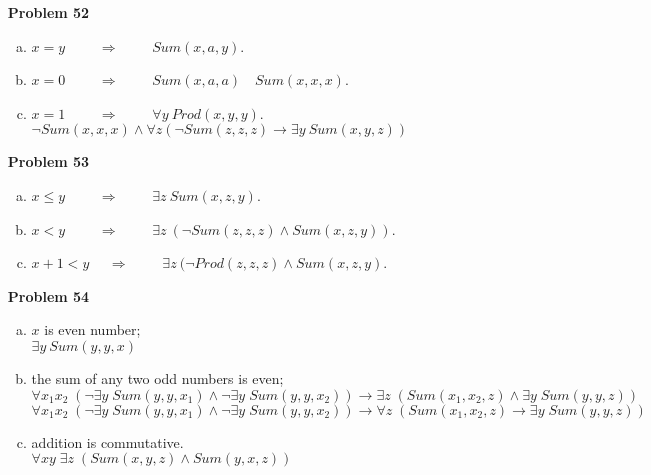 \begin{enumerate}
\item[\textbf{Problem 52}] 
\begin{enumerate}[(a)]
\item $x = y$   $\qquad \Rightarrow \qquad $ $Sum(x, a, y)$. 
\item $x = 0$   $\qquad \Rightarrow \qquad $ $Sum(x, a, a) \quad Sum(x, x, x)$. 
\item $x = 1$   $\qquad \Rightarrow \qquad $ $\forall y \:Prod(x, y, y)$. \\
                       $\neg Sum(x, x, x) \wedge \forall z(\neg Sum(z, z, z) \rightarrow \exists y \: Sum(x, y, z))$
\end{enumerate}

\item[\textbf{Problem 53}] 
\begin{enumerate}[(a)]
\item $x \leq y$ $\qquad \Rightarrow \qquad $ $ \exists z \: Sum(x, z, y)$. 
\item $x < y$    $\qquad \Rightarrow \qquad $ $ \exists z \: (\neg Sum(z, z, z) \wedge Sum(x, z, y))$.
\item $x + 1 < y$   $\quad \Rightarrow \qquad $ $ \exists z \: (\neg Prod(z, z, z) \wedge Sum(x, z, y)$. 
\end{enumerate}

\item[\textbf{Problem 54}] 
\begin{enumerate}[(a)]
\item $x$ is even number; \\
$\exists y \: Sum(y, y, x)$
\item the sum of any two odd numbers is even; \\
$\forall x_1 x_2 \; (\neg \exists y \; Sum(y, y, x_1) \wedge \neg \exists y \; Sum(y, y, x_2)) \rightarrow \exists z \; (Sum (x_1, x_2, z) \wedge \exists y \; Sum(y, y, z))$ \\
$\forall x_1 x_2 \; (\neg \exists y \; Sum(y, y, x_1) \wedge \neg \exists y \; Sum(y, y, x_2)) \rightarrow \forall z \; (Sum (x_1, x_2, z) \rightarrow \exists y \; Sum(y, y, z))$


\item addition is commutative. \\
$\forall xy \; \exists z \; (Sum(x, y, z) \wedge Sum(y, x, z))$
\end{enumerate}


\end{enumerate}
